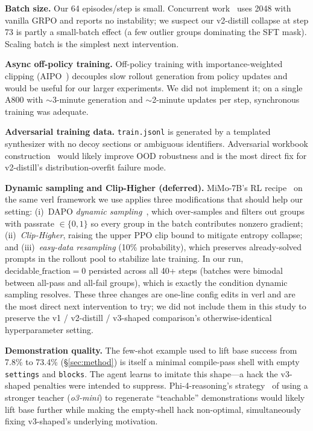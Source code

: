 \documentclass[10pt]{article}
\begin{document}
\textbf{Batch size.} Our 64 episodes/step is small. Concurrent
work~\cite{ramp2026fastask} uses 2048 with vanilla GRPO and reports
no instability; we suspect our v2-distill collapse at step 73 is partly
a small-batch effect (a few outlier groups dominating the SFT mask).
Scaling batch is the simplest next intervention.

\textbf{Async off-policy training.}
Off-policy training with importance-weighted clipping
(AIPO~\cite{ramp2026fastask}) decouples slow rollout generation
from policy updates and would be useful for our larger experiments.
We did not implement it; on a single A800 with $\sim$3-minute generation
and $\sim$2-minute updates per step, synchronous training was
adequate.

\textbf{Adversarial training data.} \texttt{train.jsonl} is generated by
a templated synthesizer with no decoy sections or ambiguous identifiers.
Adversarial workbook construction~\cite{ramp2026fastask} would
likely improve OOD robustness and is the most direct fix for
v2-distill's distribution-overfit failure mode.

\textbf{Dynamic sampling and Clip-Higher (deferred).} MiMo-7B's RL
recipe~\cite{xiaomi2025mimo} on the same verl framework we use applies
three modifications that should help our setting: (i)~DAPO
\emph{dynamic sampling}~\cite{yu2025dapo}, which over-samples and
filters out groups with passrate $\in \{0, 1\}$ so every group in the
batch contributes nonzero gradient; (ii)~\emph{Clip-Higher}, raising
the upper PPO clip bound to mitigate entropy collapse; and
(iii)~\emph{easy-data resampling} (10\% probability), which preserves
already-solved prompts in the rollout pool to stabilize late training.
In our run, $\mathrm{decidable\_fraction}=0$ persisted across all
40+ steps (batches were bimodal between all-pass and all-fail
groups), which is exactly the condition dynamic sampling resolves.
These three changes are one-line config edits in verl and are the
most direct next intervention to try; we did not include them in this
study to preserve the v1 / v2-distill / v3-shaped comparison's
otherwise-identical hyperparameter setting.

\textbf{Demonstration quality.} The few-shot example used to lift
base success from 7.8\% to 73.4\% (\S\ref{sec:method}) is itself a
minimal compile-pass shell with empty \texttt{settings} and
\texttt{blocks}. The agent learns to imitate this shape---a hack the
v3-shaped penalties were intended to suppress. Phi-4-reasoning's
strategy~\cite{phi4reasoning} of using a stronger teacher
(\emph{o3-mini}) to regenerate ``teachable'' demonstrations would
likely lift base further while making the empty-shell hack
non-optimal, simultaneously fixing v3-shaped's underlying motivation.
\end{document}
